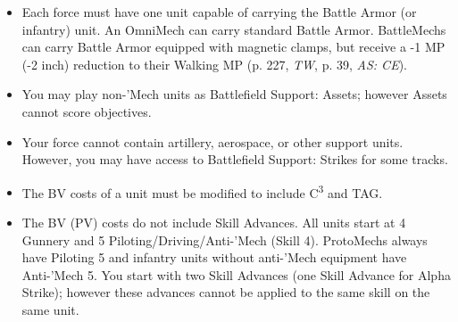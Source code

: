 \begin{itemize}
\item Each force must have one unit capable of carrying the Battle Armor (or infantry) unit.
An OmniMech can carry standard Battle Armor.
BattleMechs can carry Battle Armor equipped with magnetic clamps, but receive a -1 MP (-2 inch) reduction to their Walking MP (p. 227, \emph{TW}, p. 39, \emph{AS: CE}).

\item You may play non-'Mech units as Battlefield Support: Assets; however Assets cannot score objectives.

\item Your force cannot contain artillery, aerospace, or other support units.
However, you may have access to Battlefield Support: Strikes for some tracks.

\item The BV costs of a unit must be modified to include C\textsuperscript{3} and TAG.

\item The BV (PV) costs do not include Skill Advances.
All units start at 4 Gunnery and 5 Piloting/Driving/Anti-'Mech (Skill 4).
ProtoMechs always have Piloting 5 and infantry units without anti-'Mech equipment have Anti-'Mech 5.
You start with two Skill Advances (one Skill Advance for Alpha Strike); however these advances cannot be applied to the same skill on the same unit.

\end{itemize}

